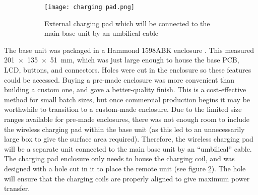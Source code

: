 \begin{figure}[htb]
	\centering
	\begin{subfigure}[b]{0.4\linewidth}
		\texttt{[image: charging pad.png]}
		\caption{External charging pad which will be connected to the main base unit by an umbilical cable}
		\label{fig: charging pad}
	\end{subfigure}
	\caption{}
\end{figure}

The base unit was packaged in a Hammond 1598ABK enclosure \cite{hammond}. This measured \SI{201x135x51}{\milli\metre}, which was just large enough to house the base PCB, LCD, buttons, and connectors. Holes were cut in the enclosure so these features could be accessed. Buying a pre-made enclosure was more convenient than building a custom one, and gave a better-quality finish. This is a cost-effective method for small batch sizes, but once commercial production begins it may be worthwhile to transition to a custom-made enclosure. Due to the limited size ranges available for pre-made enclosures, there was not enough room to include the wireless charging pad within the base unit (as this led to an unnecessarily large box to give the surface area required). Therefore, the wireless charging pad will be a separate unit connected to the main base unit by an ``umbilical'' cable. The charging pad enclosure only needs to house the charging coil, and was designed with a hole cut in it to place the remote unit (see figure \ref{fig: charging pad}). The hole will ensure that the charging coils are properly aligned to give maximum power transfer.

